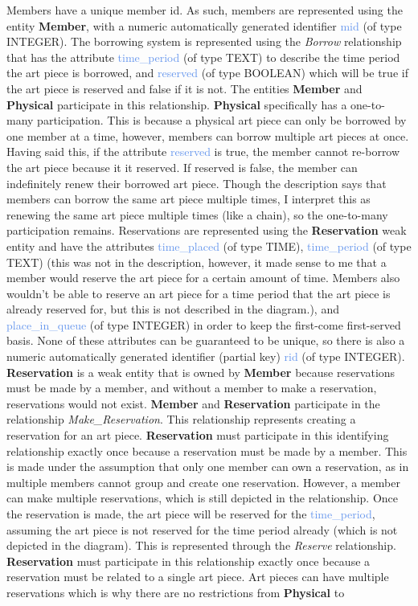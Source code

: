 \documentclass[11pt]{article}
\begin{document}
Members have a unique member id. As such, members are represented using the entity \textbf{Member}, with a numeric automatically generated identifier \textcolor{CornflowerBlue}{mid} (of type INTEGER). The borrowing system is represented using the \textit{Borrow} relationship that has the attribute \textcolor{CornflowerBlue}{time\_period} (of type TEXT) to describe the time period the art piece is borrowed, and \textcolor{CornflowerBlue}{reserved} (of type BOOLEAN) which will be true if the art piece is reserved and false if it is not. The entities \textbf{Member} and \textbf{Physical} participate in this relationship. \textbf{Physical} specifically has a one-to-many participation. This is because a physical art piece can only be borrowed by one member at a time, however, members can borrow multiple art pieces at once. Having said this, if the attribute \textcolor{CornflowerBlue}{reserved} is true, the member cannot re-borrow the art piece because it it reserved. If reserved is false, the member can indefinitely renew their borrowed art piece. Though the description says that members can borrow the same art piece multiple times, I interpret this as renewing the same art piece multiple times (like a chain), so the one-to-many participation remains. Reservations are represented using the \textbf{Reservation} weak entity and have the attributes \textcolor{CornflowerBlue}{time\_placed} (of type TIME), \textcolor{CornflowerBlue}{time\_period} (of type TEXT) (this was not in the description, however, it made sense to me that a member would reserve the art piece for a certain amount of time. Members also wouldn't be able to reserve an art piece for a time period that the art piece is already reserved for, but this is not described in the diagram.), and \textcolor{CornflowerBlue}{place\_in\_queue} (of type INTEGER) in order to keep the first-come first-served basis. None of these attributes can be guaranteed to be unique, so there is also a numeric automatically generated identifier (partial key) \textcolor{CornflowerBlue}{rid} (of type INTEGER). \textbf{Reservation} is a weak entity that is owned by \textbf{Member} because reservations must be made by a member, and without a member to make a reservation, reservations would not exist. \textbf{Member} and \textbf{Reservation} participate in the relationship \textit{Make\_Reservation}. This relationship represents creating a reservation for an art piece. \textbf{Reservation} must participate in this identifying relationship exactly once because a reservation must be made by a member. This is made under the assumption that only one member can own a reservation, as in multiple members cannot group and create one reservation. However, a member can make multiple reservations, which is still depicted in the relationship. Once the reservation is made, the art piece will be reserved for the \textcolor{CornflowerBlue}{time\_period}, assuming the art piece is not reserved for the time period already (which is not depicted in the diagram). This is represented through the \textit{Reserve} relationship. \textbf{Reservation} must participate in this relationship exactly once because a reservation must be related to a single art piece. Art pieces can have multiple reservations which is why there are no restrictions from \textbf{Physical} to 
\end{document}
